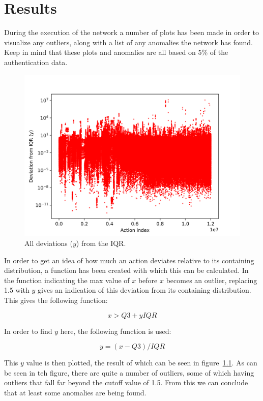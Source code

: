 \chapter{Results}\label{ch:results}

During the execution of the network a number of plots has been made in order to visualize any outliers, along with a list of any anomalies the network has found. Keep in mind that these plots and anomalies are all based on 5\% of the authentication data.

\begin{figure}
	\begin{center}
		\includegraphics[scale=0.1]{results/all_deviations}
	\end{center}
	\caption{All deviations (\(y\)) from the IQR.~\label{fig:iqr_scale}}
\end{figure}

In order to get an idea of how much an action deviates relative to its containing distribution, a function has been created with which this can be calculated. In the function indicating the max value of \(x\) before \(x\) becomes an outlier, replacing 1.5 with \(y\) gives an indication of this deviation from its containing distribution. This gives the following function:

$$ x > Q3 + y IQR $$

In order to find \(y\) here, the following function is used:

$$ y = (x - Q3) / IQR $$

This \(y\) value is then plotted, the result of which can be seen in figure~\ref{fig:iqr_scale}. As can be seen in teh figure, there are quite a number of outliers, some of which having outliers that fall far beyond the cutoff value of 1.5. From this we can conclude that at least some anomalies are being found. 

